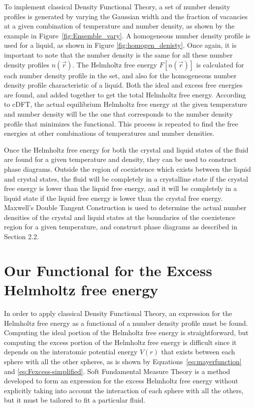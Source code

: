 \documentclass[double,12pt]{beavtex}
\begin{document}
To implement classical Density Functional Theory, 
a set of number density profiles is generated by varying the Gaussian width 
and the fraction of vacancies at a given combination of temperature and 
number density, as shown by the example in Figure~\ref{fig:Ensemble_vary}.
A homogeneous number density profile is used for a liquid, as shown in 
Figure \ref{fig:homogen_denisty}.
Once again, it is important to note that the number density is the same 
for all these number density profiles $n(\vec{r})$.  
The Helmholtz free energy $F[n(\vec{r})]$ is calculated for each number 
density profile in the set, and also for the homogeneous number density profile 
characteristic of a liquid. Both the ideal and excess free energies are 
found, and added together to get the total Helmholtz free energy.
According to cDFT, the actual equilibrium Helmholtz free energy at
the given temperature and number density will be the one
that corresponds to the number density profile that minimizes the functional. 
This process is repeated to find the free energies at other combinations 
of temperatures and number densities. 

Once the Helmholtz free energy for both the crystal and liquid states of 
the fluid are found for a given temperature and density, they can be 
used to construct phase diagrams.
Outside the region of coexistence which exists between the liquid and 
crystal states, the fluid will be completely in a crystalline state if the 
crystal free energy is lower than the liquid free energy, and it will be 
completely in a liquid state if the liquid free energy is lower than 
the crystal free energy. Maxwell's Double Tangent Construction is used 
to determine the actual number densities of the crystal and liquid states
at the boundaries of the coexistence region for a given temperature, 
and construct phase diagrams as described in Section 2.2.

\section{Our Functional for the Excess Helmholtz free energy}
In order to apply classical Density Functional Theory, an expression 
for the Helmholtz free energy as a functional of a number density profile 
must be found. Computing the ideal portion of the 
Helmholtz free energy is straightforward, but computing the excess portion 
of the Helmholtz free energy is difficult since it depends on the interatomic 
potential energy $V(r)$ that exists between each sphere with all the other spheres, 
as is shown by Equations~\ref{eq:mayerfunction} and \ref{eq:Fexcess-simplified}.
Soft Fundamental Measure Theory is a method
developed to form an expression for the excess Helmholtz free energy without
explicitly taking into account the interaction of each sphere with all the others, 
but it must be tailored to fit a particular fluid\cite{schmidt1999density}.  
\end{document}
